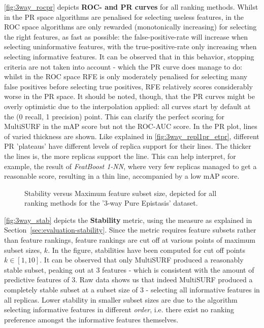 \documentclass{article}
\begin{document}
\autoref{fig:3way_rocpr} depicts \textbf{ROC- and PR curves} for all ranking methods. Whilst in the PR space algorithms are penalised for selecting useless features, in the ROC space algorithms are only rewarded (monotonically increasing) for selecting the right features, as fast as possible: the false-positive-rate will increase when selecting uninformative features, with the true-positive-rate only increasing when selecting informative features. It can be observed that in this behavior, stopping criteria are not taken into account - which the PR curve does manage to do: whilst in the ROC space RFE is only moderately penalised for selecting many false positives before selecting true positives, RFE relatively scores considerably worse in the PR space. It should be noted, though, that the PR curves might be overly optimistic due to the interpolation applied: all curves start by default at the (0 recall, 1 precision) point. This can clarify the perfect scoring for MultiSURF in the mAP score but not the ROC-AUC score. In the PR plot, lines of varied thickness are shown. Like explained in \autoref{fig:3way_repl1pr_etpr}, different PR 'plateaus' have different levels of replica support for their lines. The thicker the lines is, the more replicas support the line. This can help interpret, for example, the result of \textit{FeatBoost 1-NN}, where very few replicas managed to get a reasonable score, resulting in a thin line, accompanied by a low mAP score.

\begin{figure}[ht]
\centering

\caption{Stability versus Maximum feature subset size, depicted for all ranking methods for the '3-way  Pure  Epistasis' dataset.}
\label{fig:3way_stab}
\end{figure}

\autoref{fig:3way_stab} depicts the \textbf{Stability} metric, using the measure as explained in Section~\ref{sec:evaluation-stability}. Since the metric requires feature subsets rather than feature rankings, feature rankings are cut off at various points of maximum subset sizes, $k$. In the figure, stabilities have been computed for cut off points $k \in [1, 10]$. It can be observed that only MultiSURF produced a reasonably stable subset, peaking out at 3 features - which is consistent with the amount of predictive features of 3. Raw data shows us that indeed MultiSURF produced a completely stable subset at a subset size of 3 - selecting all informative features in all replicas. Lower stability in smaller subset sizes are due to the algorithm selecting informative features in different \textit{order}, i.e. there exist no ranking preference amongst the informative features themselves.
\end{document}
